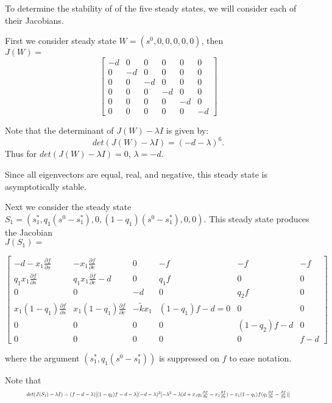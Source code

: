 \documentclass[12pt]{article}
\begin{document}
\noindent To determine the stability of of the five steady states, we will consider each of their Jacobians.

\noindent First we consider steady state $W=(s^0,0,0,0,0,
0)$, then\\ $J(W)=$ 
\[ 
\begin{bmatrix}
-d & 0 & 0 & 0 & 0 & 0\\
0 & -d & 0 & 0 & 0 & 0\\
0 & 0 & -d & 0 & 0 & 0 \\
0 & 0 & 0 & -d & 0 & 0 \\
0 &0 & 0 & 0 & -d & 0 \\
0 & 0 & 0 & 0 & 0 & -d
\end{bmatrix}
\]

\noindent Note that the determinant of $J(W)-\lambda I$ is given by: $$det(J(W)-\lambda I)=(-d-\lambda)^6.$$ Thus for $det(J(W)-\lambda I)=0$, $\lambda = -d$. 

\noindent Since all eigenvectors are equal, real, and negative, this steady state is asymptotically stable.  

\noindent Next we consider the steady state $S_1=(s_1^*, q_1(s^0-s_1^*),0,(1-q_1)(s^0-s_1^*),0,0).$ This steady state produces the Jacobian \\$J(S_1)=$

\[ 
\begin{bmatrix}
-d-x_1 \frac{\partial f}{\partial s} & -x_1 \frac{\partial f}{\partial e} & 0 & -f & -f & -f\\
q_1 x_1 \frac{\partial f}{\partial s} & q_1 x_1 \frac{\partial f}{\partial e}-d & 0 & q_1 f & 0 & 0 \\
0 & 0 & -d & 0 & q_2 f & 0 \\
x_1(1-q_1)\frac{\partial f}{\partial s} & x_1(1-q_1)\frac{\partial f}{\partial e} & -\tilde{k} x_1 & (1-q_1) f-d=0 & 0 & 0 \\
0 & 0 & 0 & 0 & (1-q_2) f-d & 0 \\
0 & 0 & 0 & 0 & 0 & f-d
\end{bmatrix}
\]

\noindent where the argument $(s_1^*,q_1(s^0-s_1^*))$ is suppressed on $f$ to ease notation.  

\noindent Note that
\begin{equation*}
\resizebox{0.9\hsize}{!}{$det(J(S_1)-\lambda I)=(f-d-\lambda)[(1-q_2)f-d-\lambda](-d-\lambda )^2[-\lambda^2 - \lambda (d+x_1 q_1 \frac{\partial f}{\partial e} - x_1 \frac{\partial f}{\partial s}) - x_1(1-q_1)f(q_1\frac{\partial f}{\partial e} - \frac{\partial f}{\partial s}) ]$}
\end{equation*}
\end{document}
